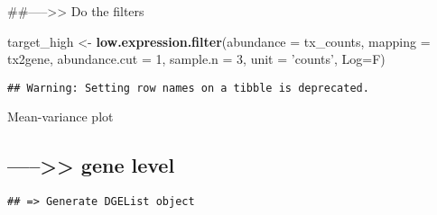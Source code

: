 \documentclass[]{article}
\newenvironment{Shaded}{\begin{snugshade}}{\end{snugshade}}
\newcommand{\DataTypeTok}[1]{\textcolor[rgb]{0.13,0.29,0.53}{#1}}
\newcommand{\DecValTok}[1]{\textcolor[rgb]{0.00,0.00,0.81}{#1}}
\newcommand{\KeywordTok}[1]{\textcolor[rgb]{0.13,0.29,0.53}{\textbf{#1}}}
\newcommand{\NormalTok}[1]{#1}
\newcommand{\OperatorTok}[1]{\textcolor[rgb]{0.81,0.36,0.00}{\textbf{#1}}}
\newcommand{\StringTok}[1]{\textcolor[rgb]{0.31,0.60,0.02}{#1}}
\begin{document}
\#\#-----\textgreater{}\textgreater{} Do the filters

\begin{Shaded}
\begin{Highlighting}[]
\NormalTok{target_high <-}\StringTok{ }\KeywordTok{low.expression.filter}\NormalTok{(}\DataTypeTok{abundance =}\NormalTok{ tx_counts, }
                                     \DataTypeTok{mapping =}\NormalTok{ tx2gene,}
                                     \DataTypeTok{abundance.cut =} \DecValTok{1}\NormalTok{,}
                                     \DataTypeTok{sample.n =} \DecValTok{3}\NormalTok{,}
                                     \DataTypeTok{unit =} \StringTok{'counts'}\NormalTok{,}
                                     \DataTypeTok{Log=}\NormalTok{F)}
\end{Highlighting}
\end{Shaded}

\begin{verbatim}
## Warning: Setting row names on a tibble is deprecated.
\end{verbatim}

Mean-variance plot

\hypertarget{gene-level}{%
\subsection{-----\textgreater{}\textgreater{} gene
level}\label{gene-level}}

\begin{Shaded}
\end{Shaded}

\begin{verbatim}
## => Generate DGEList object
\end{verbatim}
\end{document}
